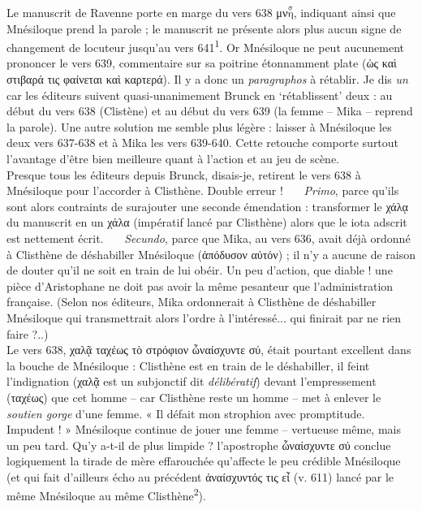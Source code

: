 \documentclass[12pt]{book}%
\newcommand{\italique}[1]{\textit{#1}}%
\newcommand{\auDessus}[2]{$\overset{\text{#2}}{\text{#1}}$}
\newcommand{\marqueur}[1]{\textsuperscript{#1}}%
\newenvironment{groupe}{%
\pstart%
\ledgroup%
}{%
\pend %
}%
\begin{document}
\begin{pages}
\begin{Leftside}
\begin{groupe}
{{%
Le manuscrit de Ravenne porte en marge du vers 638 μν\auDessus{η}{σ}, indiquant ainsi que Mnésiloque prend la parole ; le manuscrit ne présente alors plus aucun signe de changement de locuteur jusqu'au vers 641\marqueur{1}. Or Mnésiloque %
ne peut aucunement prononcer le vers 639, commentaire sur sa poitrine étonnamment plate (ὡς καὶ στιβαρά τις φαίνεται καὶ καρτερά).
Il y a donc un \italique{paragraphos} à rétablir.
Je dis \italique{un} car les éditeurs suivent quasi-unanimement Brunck en `rétablissent' deux : au début du vers 638 (Clistène) et au début du vers 639 (la femme -- Mika -- reprend la parole).
Une autre solution me semble plus légère : laisser à Mnésiloque les deux vers 637-638 et à Mika les vers 639-640.
Cette retouche comporte surtout l'avantage d'être bien meilleure quant à l'action et au jeu de scène.\\
Presque tous les éditeurs depuis Brunck, disais-je, retirent le vers 638 à Mnésiloque pour l'accorder à Clisthène. Double erreur ! \ \ \ \italique{Primo}, parce qu'ils sont alors contraints de surajouter une seconde émendation : transformer le χάλᾳ du manuscrit en un χάλα (impératif lancé par Clisthène) alors que le iota adscrit est nettement écrit. \ \ \ \italique{Secundo}, parce que Mika, au vers 636, avait déjà ordonné à Clisthène de déshabiller Mnésiloque (ἀπόδυσον αὐτόν) ; il n'y a aucune de raison de douter qu'il ne soit en train de lui obéir. Un peu d'action, que diable ! une pièce d'Aristophane ne doit pas avoir la même pesanteur que l'administration française. (Selon nos éditeurs, Mika ordonnerait à Clisthène de déshabiller Mnésiloque qui transmettrait alors l'ordre à l'intéressé... qui finirait par ne rien faire ?..)\\
Le vers 638, χαλᾷ ταχέως τὸ στρόφιον ὦναίσχυντε σύ, était pourtant excellent dans la bouche de Mnésiloque : Clisthène est en train de le déshabiller, il feint l'indignation (χαλᾷ est un subjonctif dit \italique{délibératif}) devant l'empressement (ταχέως) que cet homme -- car Clisthène reste un homme -- met à enlever le \italique{soutien gorge} d'une femme. « Il défait mon strophion avec promptitude. Impudent ! » Mnésiloque continue de jouer une femme -- vertueuse même, mais un peu tard. Qu'y a-t-il de plus limpide ? l'apostrophe ὦναίσχυντε σύ conclue logiquement la tirade de mère effarouchée qu'affecte le peu crédible Mnésiloque (et qui fait d'ailleurs écho au précédent ἀναίσχυντός τις εἶ (v. 611) lancé par le même Mnésiloque au même Clisthène\marqueur{2}).
}}
\end{groupe}
\end{Leftside}
\end{pages}
\end{document}
